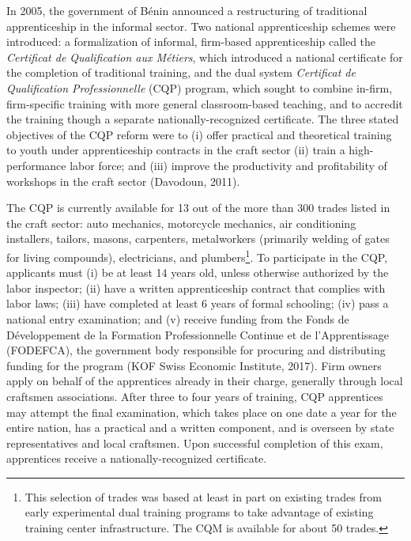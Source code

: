 \documentclass[
  11pt,
a4paper
]{report}
\begin{document}
In 2005, the government of Bénin announced a restructuring of traditional apprenticeship in the informal sector. Two national apprenticeship schemes were introduced: a formalization of informal, firm-based apprenticeship called the \emph{Certificat de Qualification aux Métiers}, which introduced a national certificate for the completion of traditional training, and the dual system \emph{Certificat de Qualification Professionnelle} (CQP) program, which sought to combine in-firm, firm-specific training with more general classroom-based teaching, and to accredit the training though a separate nationally-recognized certificate. The three stated objectives of the CQP reform were to (i) offer practical and theoretical training to youth under apprenticeship contracts in the craft sector (ii) train a high-performance labor force; and (iii) improve the productivity and profitability of workshops in the craft sector (Davodoun, 2011).

The CQP is currently available for 13 out of the more than 300 trades listed in the craft sector: auto mechanics, motorcycle mechanics, air conditioning installers, tailors, masons, carpenters, metalworkers (primarily welding of gates for living compounds), electricians, and plumbers\footnote{This selection of trades was based at least in part on existing trades from early experimental dual training programs to take advantage of existing training center infrastructure. The CQM is available for about 50 trades.}. To participate in the CQP, applicants must (i) be at least 14 years old, unless otherwise authorized by the labor inspector; (ii) have a written apprenticeship contract that complies with labor laws; (iii) have completed at least 6 years of formal schooling; (iv) pass a national entry examination; and (v) receive funding from the Fonds de Développement de la Formation Professionnelle Continue et de l'Apprentissage (FODEFCA), the government body responsible for procuring and distributing funding for the program (KOF Swiss Economic Institute, 2017). Firm owners apply on behalf of the apprentices already in their charge, generally through local craftsmen associations. After three to four years of training, CQP apprentices may attempt the final examination, which takes place on one date a year for the entire nation, has a practical and a written component, and is overseen by state representatives and local craftsmen. Upon successful completion of this exam, apprentices receive a nationally-recognized certificate.
\end{document}
